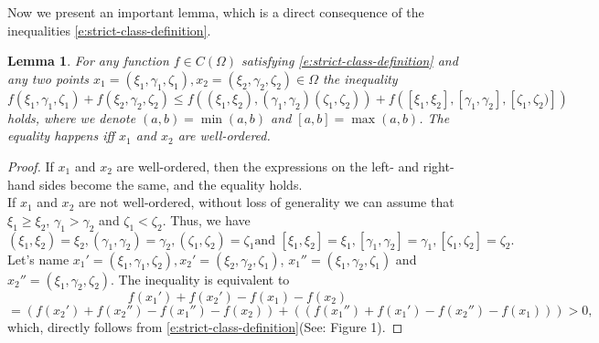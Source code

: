 \documentclass[12p]{article}
\numberwithin{equation}{section}
\newtheorem{lemma}{Lemma}[section]
\begin{document}
Now we present an important lemma, which is a direct consequence of the inequalities \eqref{e:strict-class-definition}.
\begin{lemma} \label{main-func-ineq}
For any function \(f \in C(\Omega)\) satisfying \eqref{e:strict-class-definition} and any two points \(x_1=(\xi_1, \gamma_1, \zeta_1),x_2=(\xi_2, \gamma_2, \zeta_2) \in \Omega\) the inequality
\begin{equation} \label{e:ordering}
    f(\xi_1, \gamma_1, \zeta_1)+f(\xi_2, \gamma_2, \zeta_2) \le f\left((\xi_1,\xi_2),( \gamma_1,\gamma_2)(\zeta_1,\zeta_2)\right) +f\left([\xi_1,\xi_2],[\gamma_1,\gamma_2],[\zeta_1,\zeta_2)]\right)
\end{equation}
holds, where we denote \((a,b)=\min(a,b)\) and \([a,b]=\max(a,b)\). The equality happens iff \(x_1\) and \(x_2\) are well-ordered.
\end{lemma}
\begin{proof} 
    If \(x_1\) and \(x_2\) are well-ordered, then the expressions on the left- and right-hand sides become the same, and the equality holds.\\
    If \(x_1\) and \(x_2\) are not well-ordered, without loss of generality we can assume that \(\xi_1 \ge \xi_2\), \(\gamma_1 > \gamma_2\) and \(\zeta_1 < \zeta_2\).
    Thus, we have
    \[
    (\xi_1,\xi_2)=\xi_2, (\gamma_1,\gamma_2)=\gamma_2,(\zeta_1,\zeta_2)=\zeta_1
    \text{
     and 
    }
    [\xi_1,\xi_2]=\xi_1, [\gamma_1,\gamma_2]=\gamma_1,[\zeta_1,\zeta_2]=\zeta_2.
    \]
Let's name \(x_1'=(\xi_1, \gamma_1, \zeta_2),x_2'=(\xi_2, \gamma_2, \zeta_1)\), \(x_1''=(\xi_1, \gamma_2, \zeta_1) \) and \( x_2''=(\xi_1, \gamma_2, \zeta_2)\).
The inequality is equivalent to
    \[
    f(x_1') + f(x_2') - f(x_1) - f(x_2)
    \]
    \[
    = \left( f(x_2') + f(x_2'') - f(x_1'') - f(x_2)\right) + \left(\left( f(x_1'') + f(x_1') - f(x_2'') - f(x_1)\right)\right) >0,
    \]
which, directly follows from \eqref{e:strict-class-definition}(See: Figure 1).
\end{proof}
\end{document}
